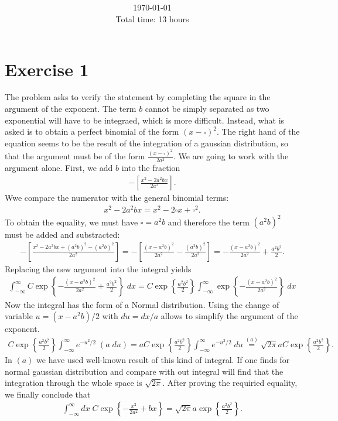 \documentclass[letterpaper,11pt,twoside]{article}
\title{\textbf{\assignment}\\\course\\{\Large\institution}}
\author{\autor}
\date{\today\\Total time: 13 hours}
\begin{document}
\pagestyle{mainstyle}
\maketitle
\section{Exercise 1}%
The problem asks to verify the statement by completing the square in the argument of the exponent. The term $b$ cannot be simply separated as two
exponential will have to be integraed, which is more difficult. Instead, what is asked is to obtain a perfect binomial of the form $(x-\square)^2$.
The right hand of the equation seems to be the result of the integration of a gaussian distribution, so that the argument must be of the form $\frac{(x-\square)^2}{2a^2}$.
We are going to work with the argument alone. First, we add $b$ into the fraction
\begin{align*}
  -\left[\frac{x^2-2a^2bx}{2a^2}\right].
\end{align*}
Wwe compare the numerator with the general binomial terms:
\begin{align*}
  x^2-2a^2bx = x^2-2\square x+\square^2.
\end{align*}
To obtain the equality, we must have $\square=a^2b$ and therefore the term $(a^2b)^2$ must be added and substracted:
\begin{align*}
  -\left[\frac{x^2-2a^2bx+(a^2b)^2-(a^2b)^2}{2a^2}\right]=-\left[\frac{(x-a^2b)^2}{2a^2}-\frac{(a^2b)^2}{2a^2}\right]=-\frac{(x-a^2b)^2}{2a^2}+\frac{a^2b^2}{2}.
\end{align*}
Replacing the new argument into the integral yields
\begin{align*}
  \int_{-\infty}^\infty C\exp\left\{-\frac{(x-a^2b)^2}{2a^2}+\frac{a^2b^2}{2}\right\}\;dx=C\exp\left\{\frac{a^2b^2}{2}\right\}\int_{-\infty}^\infty\exp\left\{-\frac{(x-a^2b)^2}{2a^2}\right\}\;dx
\end{align*}
Now the integral has the form of a Normal distribution. Using the change of variable $u=(x-a^2b)/2$ with $du=dx/a$ allows to simplify the argument of the exponent. 
\begin{align*}
  C\exp\left\{\frac{a^2b^2}{2}\right\}\int_{-\infty}^\infty e^{-u^2/2}\;\left(a\;du\right)=aC\exp\left\{\frac{a^2b^2}{2}\right\}\int_{-\infty}^\infty e^{-u^2/2}\;du\stackrel{(a)}{=}\sqrt{2\pi}aC\exp\left\{\frac{a^2b^2}{2}\right\}.
\end{align*}
In $(a)$ we have used well-known result of this kind of integral. If one finds for normal gaussian distribution and compare with out integral will find that the integration through the whole space is $\sqrt{2\pi}$.
After proving the requiried equality, we finally conclude that
\begin{align}
  \int_{-\infty}^\infty dx\;C\exp\left\{-\frac{x^2}{2a^2}+bx\right\}=\sqrt{2\pi}a\exp\left\{\frac{a^2b^2}{2}\right\}.
  \label{eq:resultexercise1}
\end{align}
\end{document}
